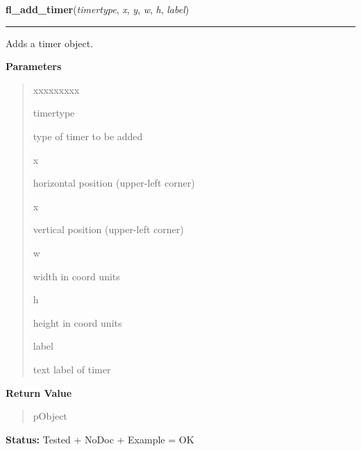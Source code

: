     \label{xformslib:library:fl_add_timer}

    \vspace{0.5ex}

\hspace{.8\funcindent}\begin{boxedminipage}{\funcwidth}

    \raggedright \textbf{fl\_add\_timer}(\textit{timertype}, \textit{x}, \textit{y}, \textit{w}, \textit{h}, \textit{label})

    \vspace{-1.5ex}

    \rule{\textwidth}{0.5\fboxrule}
\setlength{\parskip}{2ex}
    Adds a timer object.

\setlength{\parskip}{1ex}
      \textbf{Parameters}
      \vspace{-1ex}

      \begin{quote}
        \begin{Ventry}{xxxxxxxxx}

          \item[timertype]

          type of timer to be added

          \item[x]

          horizontal position (upper-left corner)

          \item[x]

          vertical position (upper-left corner)

          \item[w]

          width in coord units

          \item[h]

          height in coord units

          \item[label]

          text label of timer

        \end{Ventry}

      \end{quote}

      \textbf{Return Value}
    \vspace{-1ex}

      \begin{quote}
      pObject

      \end{quote}

\textbf{Status:} Tested + NoDoc + Example = OK



    \end{boxedminipage}

